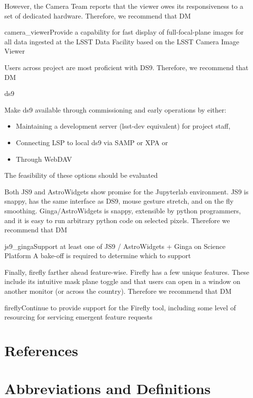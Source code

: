 \documentclass[DM,authoryear,toc]{lsstdoc}
\begin{document}
However, the Camera Team reports that the viewer owes its responsiveness to a set of dedicated hardware.
Therefore, we recommend that DM
\begin{recommendation}{camera_viewer}{Provide a capability for fast display of full-focal-plane images for all data ingested at the LSST Data Facility based on the LSST Camera Image Viewer}
\end{recommendation}

Users across project are most proficient with DS9. Therefore, we recommend that DM

\begin{recommendation}{ds9}{Make ds9 available through commissioning and early operations by either:
\begin{itemize}
\item{Maintaining a development server (lsst-dev equivalent) for project staff,}
\item{Connecting LSP to local ds9 via SAMP or XPA or}
\item{Through WebDAV}
\end{itemize}}
The feasibility of these options should be evaluated
\end{recommendation}

Both JS9 and AstroWidgets show promise for the Jupyterlab environment.
JS9 is snappy, has the same interface as DS9, mouse gesture stretch, and on the fly smoothing.
Ginga/AstroWidgets is snappy, extensible by python programmers, and it is easy to run arbitrary python code on selected pixels.
Therefore we recommend that DM
\begin{recommendation}{js9_ginga}{Support at least one of JS9 / AstroWidgets + Ginga on Science Platform}
A bake-off is required to determine which to support
\end{recommendation}


Finally, firefly farther ahead feature-wise.
Firefly has a few unique features.
These include its intuitive mask plane toggle and that users can open in a window on another monitor (or across the country).
Therefore we recommend that DM
\begin{recommendation}{firefly}{Continue to provide support for the Firefly tool, including some level of resourcing for servicing emergent feature requests}
\end{recommendation}


\appendix

\section{References}
\label{sec:bib}


\section{Abbreviations and Definitions}
\label{sec:acronyms}

\end{document}
